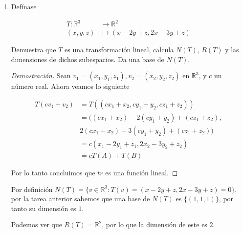 \documentclass[10pt,a4paper]{article}
\theoremstyle{definition}
\newcommand{\R}{\mathbb{R}}
\begin{document}
\begin{enumerate}
\begin{proof}[Demostración]
        Por lo tanto concluimos que $tr$ es una función lineal.
    \end{proof}

    Sea $A_{i,j}$ en $M_{n,n}(\R)$ tal que $a_{i,j} = 1$ y $a_{ii,jj} = 0$ para todo $ii \neq i$, $jj \neq j$.

    Por definición $N(tr) = \{A \in M_{n,n}(\R) : tr(A) = 0\}$, por la tarea anterior sabemos que una base de $N(tr)$ es $\{A_{i,j} : i \neq j\} \cup \{B_{i,i} = A_{i,i} - A_{i+1,i+1}: \forall i < n\}$, por tanto su dimensión es $N^2-1$.
    
    Podemos ver que $R(tr) = \R$, por lo que la dimensión de este es $1$.

    \item Defínase
    
    \begin{align*}
        T : \R^3 &\longrightarrow \R^2\\
        (x,y,z) &\longmapsto (x-2y+z,2x-3y+z) 
    \end{align*}

    Demuestra que $T$ es una transformación lineal, calcula $N(T)$, $R(T)$ y las dimensiones de dichos subespacios. Da una base de $N(T)$.

    \begin{proof}[Demostración]
        Sean $v_1 = (x_1,y_1,z_1),v_2 = (x_2,y_2,z_2)$ en $\R^3$, y $c$ un número real. Ahora veamos lo siguiente
        
        \begin{align*}
            T(cv_1 + v_2) &= T((cx_1+x_2,cy_1 + y_2,cz_1 + z_2))\\
            &= ((cx_1+x_2)-2(cy_1 + y_2)+(cz_1 + z_2),\\
            &2(cx_1+x_2)-3(cy_1 + y_2) + (cz_1 + z_2))\\
            &= c(x_1-2y_1+z_1,2x_2-3y_2+z_2)\\
            &= cT(A) + T(B)
        \end{align*}
        
        Por lo tanto concluimos que $tr$ es una función lineal.
    \end{proof}

    Por definición $N(T) = \{v \in \R^3 : T(v) = (x-2y+z,2x-3y+z) = 0\}$, por la tarea anterior sabemos que una base de $N(T)$ es $\{(1,1,1)\}$, por tanto su dimensión es $1$.
    
    \vspace{\baselineskip}
    
    Podemos ver que $R(T) = \R^2$, por lo que la dimensión de este es $2$.


\end{enumerate}
\end{document}
